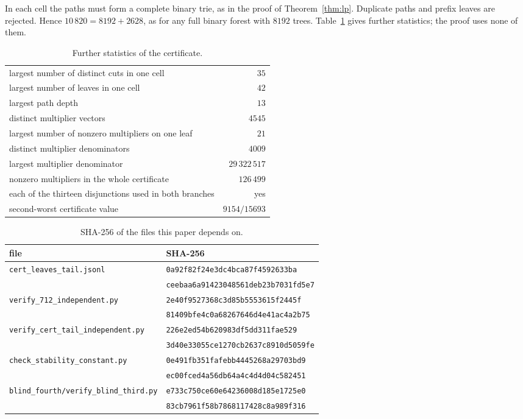 \documentclass{amsart}
\numberwithin{equation}{section}
\numberwithin{table}{section}
\begin{document}
In each cell the paths must form a complete binary trie, as in the proof of
Theorem~\ref{thm:lp}. Duplicate paths and prefix leaves are rejected. Hence $10\,820=8192+2628$, as for any full binary forest with $8192$ trees.
Table~\ref{tab:stats} gives further statistics; the proof uses none of them.

\begin{table}[ht]
\centering\small
\caption{Further statistics of the certificate.}\label{tab:stats}
\begin{tabular}{@{}lr@{}}
\hline largest number of distinct cuts in one cell & $35$\\
largest number of leaves in one cell & $42$\\
largest path depth & $13$\\
distinct multiplier vectors & $4545$\\
largest number of nonzero multipliers on one leaf & $21$\\
distinct multiplier denominators & $4009$\\
largest multiplier denominator & $29\,322\,517$\\
nonzero multipliers in the whole certificate & $126\,499$\\
each of the thirteen disjunctions used in both branches & yes\\
second-worst certificate value & $9154/15693$\\
\hline
\end{tabular}
\end{table}

\begin{table}[ht]
\centering\small
\caption{SHA-256 of the files this paper depends on.}\label{tab:sha}
\begin{tabular}{@{}l@{\ }l@{}}
\hline file & SHA-256\\\hline
\texttt{cert\_leaves\_tail.jsonl} & \texttt{0a92f82f24e3dc4bca87f4592633ba}\\
 & \texttt{ceebaa6a91423048561deb23b7031fd5e7}\\
\texttt{verify\_712\_independent.py} & \texttt{2e40f9527368c3d85b5553615f2445f}\\
 & \texttt{81409bfe4c0a68267646d4e41ac4a2b75}\\
\texttt{verify\_cert\_tail\_independent.py} & \texttt{226e2ed54b620983df5dd311fae529}\\
 & \texttt{3d40e33055ce1270cb2637c8910d5059fe}\\
\texttt{check\_stability\_constant.py} & \texttt{0e491fb351fafebb4445268a29703bd9}\\
 & \texttt{ec00fced4a56db64a4c4d4d04c582451}\\
\texttt{blind\_fourth/verify\_blind\_third.py} & \texttt{e733c750ce60e64236008d185e1725e0}\\
 & \texttt{83cb7961f58b7868117428c8a989f316}\\
\hline
\end{tabular}
\end{table}
\end{document}
